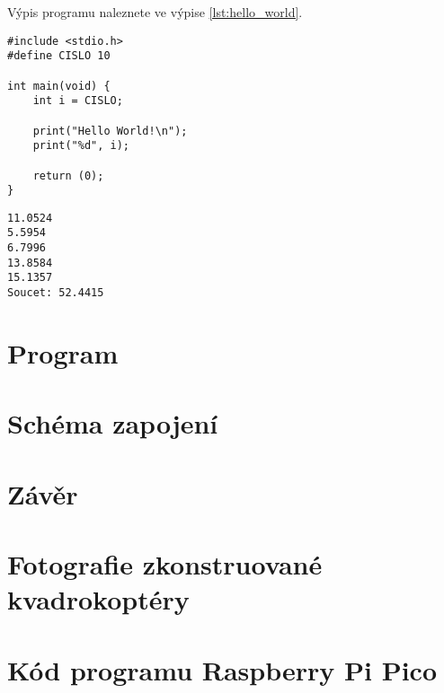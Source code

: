 \documentclass[12pt]{report}
\begin{document}
\lipsum[3]


Výpis programu   naleznete ve výpise \ref{lst:hello_world}.

\begin{lstlisting}[title={Program hello.c}, caption={hello.c}, label={lst:hello_world}]
#include <stdio.h>
#define CISLO 10

int main(void) {
	int i = CISLO;

	print("Hello World!\n");
	print("%d", i);

	return (0);
}
\end{lstlisting}

\lipsum[1]	

\begin{lstlisting}[numbers=none, title={Příklad výstupního souboru}]
11.0524
5.5954
6.7996
13.8584
15.1357
Soucet: 52.4415
\end{lstlisting}

\chapter{Program}

\lipsum[1]

\chapter{Schéma zapojení}

\lipsum[1]

\chapter*{Závěr}
	
\lipsum[1]
	
\nocite{*}
\printbibliography					%
\printglossary[title={Zkratky}]		%
\listoffigures						%
\listoftables						%

\begin{appendices}
	\chapter{Fotografie zkonstruované kvadrokoptéry}	
	\lipsum[1]
	\chapter{Kód programu Raspberry Pi Pico}  
\end{appendices}
\end{document}
